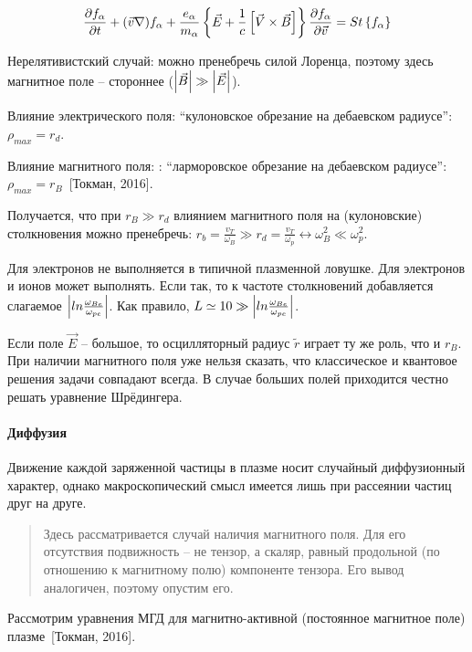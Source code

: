 \documentclass[10pt, a4paper]{article}
\newcommand{\Tokman}{~[Токман, 2016]}
\begin{document}
\begin{equation*}
	\pdv{f_\alpha}{t} + (\vec{v}\nabla)f_\alpha + \frac{e_\alpha}{m_\alpha}\left\{\vec{E}+\frac{1}{c}\left[\vec{V}\times\vec{B}\right]\right\}\pdv{f_\alpha}{\vec{v}} = St\left\{f_\alpha\right\}
\end{equation*}

Нерелятивистский случай: можно пренебречь силой Лоренца, поэтому здесь магнитное поле -- стороннее ($\abs{\vec{B}} \gg \abs{\vec{E}}$).

Влияние электрического поля: ``кулоновское обрезание на дебаевском радиусе'': $\rho_{max} = r_d$. 

Влияние магнитного поля: : ``ларморовское обрезание на дебаевском радиусе'':
$\rho_{max} = r_B$\Tokman. 

Получается, что при $r_B \gg r_d$ влиянием магнитного поля на (кулоновские) столкновения можно пренебречь: $r_b=\frac{v_T}{\omega_B} \gg r_d=\frac{v_T}{\omega_{p}} \leftrightarrow \omega_B^2 \ll \omega_{p}^2$.

Для электронов не выполняется в типичной плазменной ловушке. Для электронов и ионов может выполнять. Если так, то к частоте столкновений добавляется слагаемое $\abs{ln\frac{\omega_{Be}}{\omega_{pe}}}$. Как правило, $L \simeq 10 \gg \abs{ln\frac{\omega_{Be}}{\omega_{pe}}}$.

Если поле $\vec{E}$ -- большое, то осцилляторный радиус $\tilde{r}$ играет ту же роль, что и $r_B$. При наличии магнитного поля уже нельзя сказать, что классическое и квантовое решения задачи совпадают всегда. В случае больших полей приходится честно решать уравнение Шрёдингера.

\paragraph{Диффузия}

Движение каждой заряженной частицы в плазме носит случайный диффузионный характер, однако макроскопический смысл имеется лишь при рассеянии частиц друг на друге\cite{arzimovich}.

\begin{quotation}
	Здесь рассматривается случай наличия магнитного поля. Для его отсутствия подвижность -- не тензор, а скаляр, равный продольной (по отношению к магнитному полю) компоненте тензора. Его вывод аналогичен, поэтому опустим его.
\end{quotation}

Рассмотрим уравнения МГД для магнитно-активной (постоянное магнитное поле) плазме\Tokman. 
\end{document}
